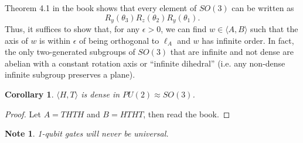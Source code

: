 \documentclass{article}
\newtheorem{cor}[thm]{Corollary}
\newtheorem*{note}{Note}
\newcommand{\AxisRotator}[1][rotate=0]{%
    \tikz [x=0.15cm,y=0.40cm,line width=.21ex,-stealth,#1] \draw (0,0) arc (-150:150:1 and 1);%
}
\begin{document}
    \begin{center}
    \end{center}

    Theorem 4.1 in the book shows that every element of $SO(3)$ can be written as
    \begin{equation*}
        R_y(\theta_3) R_z(\theta_2) R_y(\theta_1).
    \end{equation*}
    Thus, it suffices to show that, for any $\epsilon > 0$, we can find $w \in \langle A, B \rangle$ such that the axis of $w$ is within $\epsilon$ of being orthogonal to $\ell_A$ and $w$ has infinite order. In fact, the only two-generated subgroups of $SO(3)$ that are infinite and not dense are abelian with a constant rotation axis or ``infinite dihedral'' (i.e. any non-dense infinite subgroup preserves a plane).


    \begin{cor}
        $\langle H, T \rangle$ is dense in $PU(2) \approx SO(3)$.
    \end{cor}
    \begin{proof}
        Let $A = THTH$ and $B = HTHT$, then read the book.
    \end{proof}

    \begin{note}
        1-qubit gates will never be universal.
    \end{note}
\end{document}
